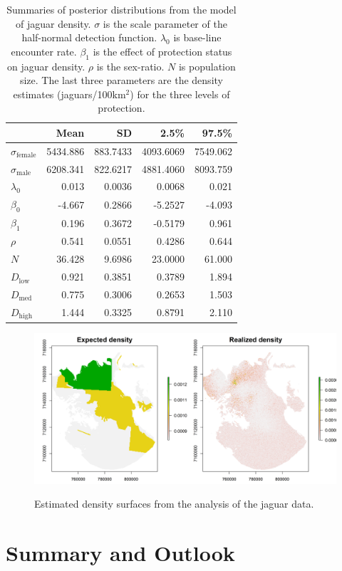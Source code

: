\begin{table}
\centering
\caption{Summaries of posterior distributions from the model of jaguar
  density. $\sigma$ is the scale parameter of
  the half-normal detection function. $\lambda_0$ is base-line encounter rate. $\beta_1$ is the
  effect of protection status on jaguar density. $\rho$ is the
  sex-ratio.  $N$ is population size. The last three parameters are the density estimates
  (jaguars/100km$^2$) for the three levels of protection.}
\begin{tabular}{lrrrr}
\hline
& Mean & SD & 2.5\% & 97.5\% \\
\hline
 $\sigma_\text{female}$ 	& 5434.886 	& 883.7433 	& 4093.6069 	& 7549.062 \\
 $\sigma_\text{male}$ 	& 6208.341 	& 822.6217 	& 4881.4060 	& 8093.759 \\
 $\lambda_0$ 	&    0.013 	&   0.0036 	&    0.0068 	&    0.021 \\
 $\beta_0$ 	&   -4.667 	&   0.2866 	&   -5.2527 	&   -4.093 \\
 $\beta_1$ 	&    0.196 	&   0.3672 	&   -0.5179 	&    0.961 \\
 $\rho$ 	&    0.541 	&   0.0551 	&    0.4286 	&    0.644 \\
 $N$ 	        &   36.428 	&   9.6986 	&   23.0000 	&   61.000 \\
 $D_\text{low}$ 	&    0.921 	&   0.3851 	&    0.3789 	&    1.894 \\
 $D_\text{med}$ 	&    0.775 	&   0.3006 	&    0.2653 	&    1.503 \\
 $D_\text{high}$ &    1.444 	&   0.3325 	&    0.8791 	&    2.110 \\
 \hline
\end{tabular}
\label{state-space.tab.jagposts}
\end{table}

\begin{figure}%
\centering
\includegraphics[width=\textwidth]{Ch11-Statespace/figs/reD}
\label{state-space.fig.Dsurface}
\caption{Estimated density surfaces from the analysis of the jaguar data.}
\end{figure}


\section{Summary and Outlook}
